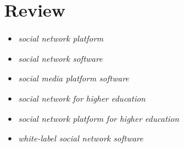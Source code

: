 \chapter{Review}
\label{chapter:review}

\begin{itemize}
  \item \emph{social network platform}
  \item \emph{social network software}
  \item \emph{social media platform software}
  \item \emph{social network for higher education}
  \item \emph{social network platform for higher education}
  \item \emph{white-label social network software}
\end{itemize}